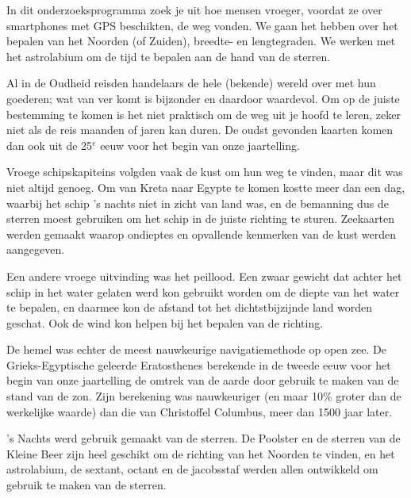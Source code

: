 In dit onderzoeksprogramma zoek je uit hoe mensen vroeger, voordat ze over smartphones met GPS beschikten, de weg vonden. We gaan het hebben over het bepalen van het Noorden (of Zuiden), breedte- en lengtegraden. We werken met het astrolabium om de tijd te bepalen aan de hand van de sterren.

Al in de Oudheid reisden handelaars de hele (bekende) wereld over met hun goederen; wat van ver komt is bijzonder en daardoor waardevol. Om op de juiste bestemming te komen is het niet praktisch om de weg uit je hoofd te leren, zeker niet als de reis maanden of jaren kan duren. De oudst gevonden kaarten komen dan ook uit de 25$^{e}$ eeuw voor het begin van onze jaartelling. 

Vroege schipskapiteins volgden vaak de kust om hun weg te vinden, maar dit was niet altijd genoeg. Om van Kreta naar Egypte te komen kostte meer dan een dag, waarbij het schip 's nachts niet in zicht van land was, en de bemanning dus de sterren moest gebruiken om het schip in de juiste richting te sturen. Zeekaarten werden gemaakt waarop ondieptes en opvallende kenmerken van de kust werden aangegeven.

Een andere vroege uitvinding was het peillood. Een zwaar gewicht dat achter het schip in het water gelaten werd kon gebruikt worden om de diepte van het water te bepalen, en daarmee kon de afstand tot het dichtstbijzijnde land worden geschat. Ook de wind kon helpen bij het bepalen van de richting.

De hemel was echter de meest nauwkeurige navigatiemethode op open zee. De Grieks-Egyptische geleerde Eratosthenes berekende in de tweede eeuw voor het begin van onze jaartelling de omtrek van de aarde door gebruik te maken van de stand van de zon. Zijn berekening was nauwkeuriger (en maar 10$\%$ groter dan de werkelijke waarde) dan die van Christoffel Columbus, meer dan 1500 jaar later.

's Nachts werd gebruik gemaakt van de sterren. De Poolster en de sterren van de Kleine Beer zijn heel geschikt om de richting van het Noorden te vinden, en het astrolabium, de sextant, octant en de jacobsstaf werden allen ontwikkeld om gebruik te maken van de sterren.



